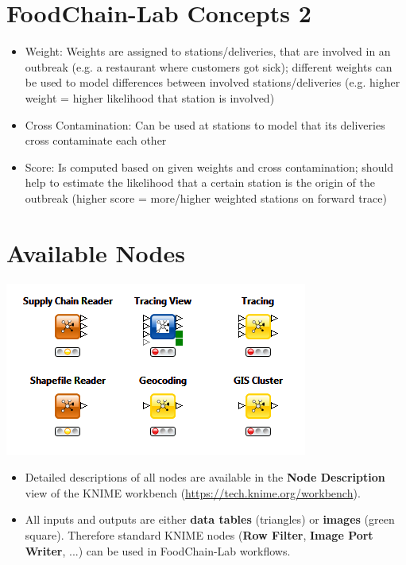 \documentclass{beamer}
\begin{document}
\section{FoodChain-Lab Concepts 2}

\begin{frame}
	\begin{itemize}
		\item Weight: Weights are assigned to stations/deliveries, that are involved in an outbreak (e.g. a restaurant where customers got sick); different weights can be used to model differences between involved stations/deliveries (e.g. higher weight = higher likelihood that station is involved)
		\item Cross Contamination: Can be used at stations to model that its deliveries cross contaminate each other
		\item Score: Is computed based on given weights and cross contamination; should help to estimate the likelihood that a certain station is the origin of the outbreak (higher score = more/higher weighted stations on forward trace)
	\end{itemize}
\end{frame}

\section{Available Nodes}
\begin{frame}
	\begin{center}
  		\includegraphics[height=0.4\textheight]{1.png}
	\end{center}
	\begin{itemize}
		\item Detailed descriptions of all nodes are available in the \textbf{Node Description} view of the KNIME workbench (\url{https://tech.knime.org/workbench}).
		\item All inputs and outputs are either \textbf{data tables} (triangles) or \textbf{images} (green square). Therefore standard KNIME nodes (\textbf{Row Filter}, \textbf{Image Port Writer}, ...) can be used in FoodChain-Lab workflows.		
	\end{itemize}
\end{frame}
 
\end{document}
